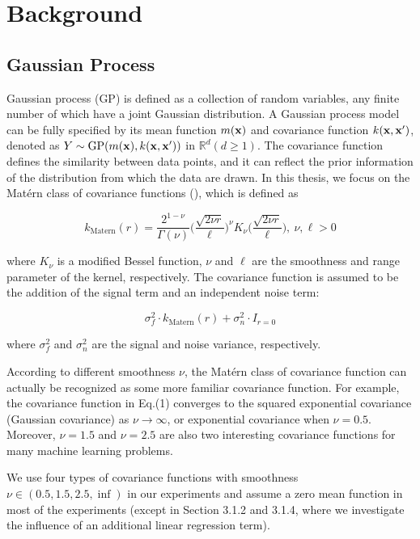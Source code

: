 \chapter{Background} 

\section{Gaussian Process}
Gaussian process (GP) is defined as a collection of random variables, any finite number of which have a joint Gaussian distribution. A Gaussian process model can be fully specified by its mean function $m(\bold{x})$ and covariance function $k(\bold{x},\bold{x'})$, denoted as $Y \sim \text{GP}(m(\bold{x}), k(\bold{x}, \bold{x'}))$ in $\mathbb{R}^d (d \geq 1)$. The covariance function defines the similarity between data points, and it can reflect the prior information of the distribution from which the data are drawn. In this thesis, we focus on the Mat\'ern class of covariance functions (\cite{williams2006gaussian}), which is defined as

\begin{equation}
    k_\text{Matern}(r) = \frac{2^{1-\nu}}{\Gamma(\nu)} \bigg(\frac{\sqrt{2\nu r}}{\ell}\bigg)^\nu K_\nu \bigg(\frac{\sqrt{2\nu r}}{\ell}\bigg), \ \nu, \ell > 0
\end{equation}

where $K_\nu$ is a modified Bessel function, $\nu$ and $\ell$ are the smoothness and range parameter of the kernel, respectively. The covariance function is assumed to be the addition of the signal term and an independent noise term:

\begin{equation}
    \sigma^2_f \cdot k_\text{Matern}(r) + \sigma^2_n \cdot I_{r=0}
\end{equation}

where $\sigma^2_f$ and $\sigma^2_n$ are the signal and noise variance, respectively.

According to different smoothness $\nu$, the Mat\'ern class of covariance function can actually be recognized as some more familiar covariance function. For example, the covariance function in Eq.(1) converges to the squared exponential covariance (Gaussian covariance) as $\nu \xrightarrow{}\infty$, or exponential covariance when $\nu = 0.5$. Moreover, $\nu = 1.5$ and $\nu = 2.5$ are also two interesting covariance functions for many machine learning problems. 

We use four types of covariance functions with smoothness $\nu \in (0.5, 1.5, 2.5, \inf)$ in our experiments and assume a zero mean function in most of the experiments (except in Section 3.1.2 and 3.1.4, where we investigate the influence of an additional linear regression term).

